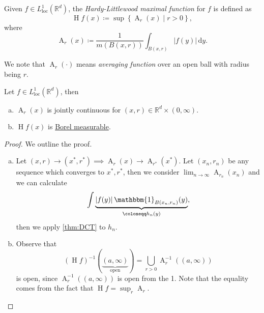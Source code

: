 \begin{definition}\label{def:HL-maximal-function}
	Given \(f\in L^1_{\text{loc} }(\mathbb{R} ^d)\), the \emph{Hardy-Littlewood maximal function} for \(f\) is defined as
	\[
		\operatorname{H}f(x) \coloneqq \sup \left\{\operatorname{A}_r(x)\mid r > 0\right\},
	\]
	where
	\[
		\operatorname{A}_r(x) \coloneqq \frac{1}{m(B(x, r))}\int _{B(x, r)} \left\vert f(y) \right\vert \,\mathrm{d}y.
	\]
\end{definition}
\begin{note}
	We note that \(\operatorname{A}_r(\cdot) \) means \emph{averaging function} over an open ball with radius being \(r\).
\end{note}
\begin{lemma}\label{lma:lec21}
	Let \(f\in L^1_{\text{loc} }(\mathbb{R} ^d)\), then
	\begin{enumerate}[(a)]
		\item \(\operatorname{A}_r(x)\) is jointly continuous for \((x, r)\in \mathbb{R} ^d \times (0, \infty )\).
		\item \(\operatorname{H}f(x) \) is \hyperref[def:Borel-measurable]{Borel measurable}.
	\end{enumerate}
\end{lemma}
\begin{proof}
	We outline the proof.
	\begin{enumerate}[(a)]
		\item Let \((x, r)\to (x^\ast, r^\ast)\implies \operatorname{A}_r(x)\to \operatorname{A}_{r^\ast}(x^\ast)\). Let \((x_{n} , r_{n} )\) be any sequence which converges to
		      \(x^\ast, r^\ast\), then we consider \(\lim_{n \to \infty} \operatorname{A}_{r_{n} }(x_{n} )\) and we can calculate
		      \[
			      \int\underbrace{\left\vert f(y) \right\vert \mathbbm{1}_{B(x_{n} , r_{n} )} (y)}_{\coloneqq h_{n} (y)},
		      \]
		      then we apply \autoref{thm:DCT} to \(h_{n} \).
		\item Observe that
		      \[
			      (\operatorname{H}f)^{-1} (\underbrace{(a, \infty )}_{\text{open} }) = \bigcup_{r>0} \operatorname{A}_{r} ^{-1} \left((a, \infty )\right)
		      \]
		      is open, since \(\operatorname{A} _{r} ^{-1} \left((a, \infty )\right)\) is open from the 1. Note that the equality comes from the fact that \(\operatorname{H}f = \sup_{r} \operatorname{A} _{r} \).
	\end{enumerate}
\end{proof}

